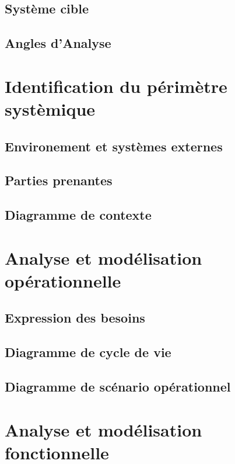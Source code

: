 \documentclass{article}
\begin{document}
\subsection{Système cible}


\subsection{Angles d'Analyse}

\subsection{}


\section{Identification du périmètre systèmique}


\subsection{Environement et systèmes externes}
\subsection{Parties prenantes}
\subsection{Diagramme de contexte} 



\section{Analyse et modélisation opérationnelle}
\subsection{Expression des besoins}
\subsection{Diagramme de cycle de vie}

\subsection{Diagramme de scénario opérationnel}


\section{Analyse et modélisation fonctionnelle}
\end{document}
